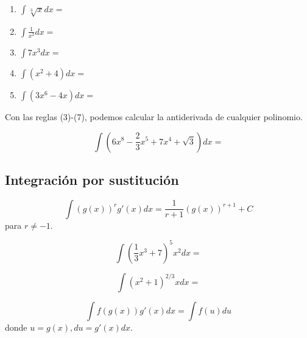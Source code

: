  \begin{problema}
  \label{soc:exmp:22.3}
  \begin{enumerate}
   \item $\int \sqrt[3]{x}dx=$
   
   \item $\int \frac{1}{x^{2}}dx=$
   
   \item $\int 7x^{3}dx=$
   
   \item $\int \left( x^{2}+4 \right)dx=$
   
   \item $\int \left( 3x^{6}-4x \right)dx=$
   
  \end{enumerate}

 \end{problema}




  Con las reglas (3)-(7), podemos calcular la antiderivada de cualquier polinomio.
 \begin{problema}
  \label{soc:exmp:22.4}
  $$\int \left( 6x^{8}-\frac{2}{3}x^{5}+7x^{4}+\sqrt{3} \right)dx=$$
 \end{problema}



\subsection{Integración por sustitución}


 \begin{prop}
 \label{regla:8}
 $$\int \left( g(x) \right)^{r}g'(x)dx=
 \dfrac{1}{r+1}\left( g(x) \right)^{r+1}+C
 $$ para $r\neq -1.$
 \end{prop}




 \begin{problema}
  \label{soc:exmp:22.5}
  $$
  \int \left( \dfrac{1}{3}x^{3}+7 \right)^{5}x^{2}dx=
  $$
 \end{problema}




 \begin{problema}
  \label{soc:exmp:22.6}
  $$
  \int \left( x^{2}+1 \right)^{2/3}xdx=
  $$
 \end{problema}




 \begin{prop}
  \label{regla:9}
  $$
  \int f\left( g(x) \right)g'(x)dx=\int f(u)du
  $$
  donde $u=g(x), du=g'(x)dx.$
 \end{prop}

